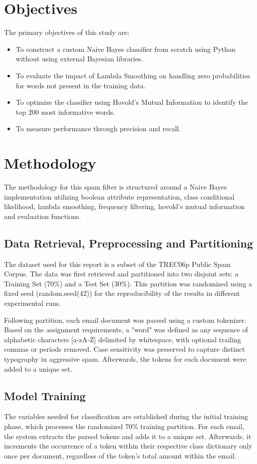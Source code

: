 \documentclass{acm_proc_article-sp}
\begin{document}
\section{Objectives} The primary objectives of this study are:
\begin{itemize}
    \item To construct a custom Naive Bayes classifier from scratch using Python without using external Bayesian libraries.
    \item To evaluate the impact of Lambda Smoothing on handling zero probabilities for words not present in the training data.
    \item To optimize the classifier using Hovold's Mutual Information to identify the top 200 most informative words.
    \item To measure performance through precision and recall.
\end{itemize}

\section{Methodology}
The methodology for this spam filter is structured around a Naive Bayes implementation utilizing boolean attribute representation, class conditional likelihood, lambda smoothing, frequency filtering, hovold's mutual information and evaluation functions. 

\subsection{Data Retrieval, Preprocessing and Partitioning}
The dataset used for this report is a subset of the TREC06p Public Spam Corpus. The data was first retrieved and partitioned into two disjoint sets: a Training Set (70\%) and a Test Set (30\%). This partition was randomized using a fixed seed (random.seed(42)) for the reproducibility of the results in different experimental runs.

Following partition, each email document was parsed using a custom tokenizer. Based on the assignment requirements, a "word" was defined as any sequence of alphabetic characters [a-zA-Z] delimited by whitespace, with optional trailing commas or periods removed. Case sensitivity was preserved to capture distinct typography in aggressive spam. Afterwards, the  tokens for each document were added to a unique set.

\subsection{Model Training}
The variables needed for classification are established during the initial training phase, which processes the randomized 70\% training partition. For each email, the system extracts the parsed tokens and adds it to a unique set. Afterwards, it increments the occurrence of a token within their respective class dictionary only once per document, regardless of the token's total amount within the email.
\end{document}
